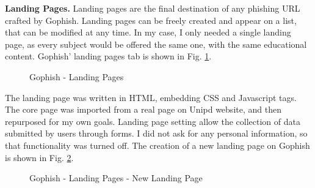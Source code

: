 \documentclass[a4paper]{article}
\begin{document}
\noindent
\textbf{Landing Pages.} Landing pages are the final destination of any phishing URL crafted by Gophish. Landing pages can be freely created and appear on a list, that can be modified at any time. In my case, I only needed a single landing page, as every subject would be offered the same one, with the same educational content. Gophish' landing pages tab is shown in Fig. \ref{gop-lp}.

\begin{figure}[H]
	\centering
	\caption{Gophish - Landing Pages}
	\label{gop-lp}
\end{figure}

\noindent
The landing page was written in HTML, embedding CSS and Javascript tags. The core page was imported from a real page on Unipd website, and then repurposed for my own goals. Landing page setting allow the collection of data submitted by users through forms. I did not ask for any personal information, so that functionality was turned off. The creation of a new landing page on Gophish is shown in Fig. \ref{gop-lpnlp}.

\begin{figure}[H]
	\centering
	\caption{Gophish - Landing Pages - New Landing Page}
	\label{gop-lpnlp}
\end{figure}
\end{document}

